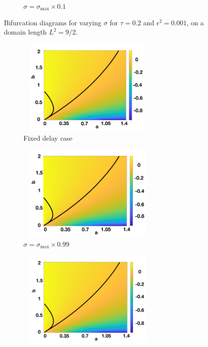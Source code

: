 \begin{figure}[H]
\begin{subfigure}[t]{0.45\textwidth}
        \caption{$\sigma=\sigma_{\max}\times0.1$}
        \label{}
    \end{subfigure}
    \caption{Bifurcation diagrams for varying $\sigma$ for $\tau=0.2$ and $\epsilon^2=0.001$, on a domain length $L^2=9/2$.}
    \label{fig:distmap1}
\end{figure}

\begin{figure}[H]
    \centering
    \begin{subfigure}[t]{0.45\textwidth}
        \centering
        \includegraphics[width=7cm,height=4.75cm]{t2f1.png}
        \caption{Fixed delay case}
        \label{}
    \end{subfigure}
    \hfill
    \begin{subfigure}[t]{0.45\textwidth}
        \centering
        \includegraphics[width=7cm,height=4.75cm]{t2f2.png}
        \caption{$\sigma=\sigma_{\max}\times0.99$}
        \label{}
    \end{subfigure}
    \hfill
    \begin{subfigure}[t]{0.45\textwidth}
        \centering
        \includegraphics[width=7cm,height=4.75cm]{t2f3.png}

\end{subfigure}
\end{figure}
